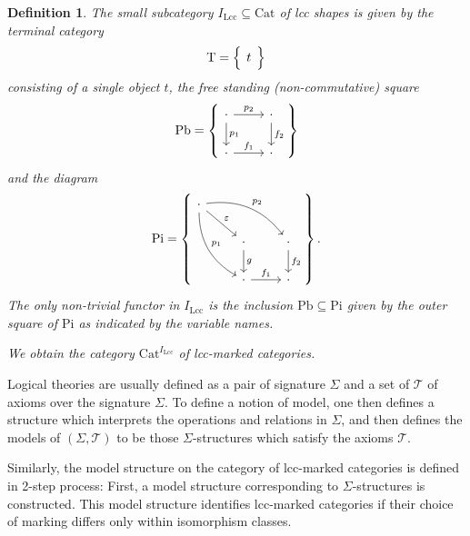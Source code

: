\documentclass{article}
\newtheorem{definition}{Definition}
\begin{document}
\begin{definition}
  The small subcategory $I_\mathrm{Lcc} \subseteq \mathrm{Cat}$ of \emph{lcc shapes} is given by the terminal category 
  \begin{equation}
    \mathrm{T} =
    \left\{
      \begin{tikzcd}
        t
      \end{tikzcd}
    \right\}
  \end{equation}
  consisting of a single object $t$, the free standing (non-commutative) square
  \begin{equation}
    \mathrm{Pb} =
    \left\{
      \begin{tikzcd}
        \cdot \arrow[d, "p_1"] \arrow[r, "p_2"] & \cdot \arrow[d, "f_2"] \\
        \cdot \arrow[r, "f_1"] & \cdot
      \end{tikzcd}
    \right\}
  \end{equation}
  and the diagram
  \begin{equation}
    \mathrm{Pi} =
    \left\{
      \begin{tikzcd}
        \cdot \arrow[ddr, bend right, "p_1"] \arrow[drr, bend left, "p_2"] \arrow[dr, "\varepsilon"] \\
        & \cdot \arrow[d, "g"] & \cdot \arrow[d, "f_2"] \\
        & \cdot \arrow[r, "f_1"] & \cdot
      \end{tikzcd}
    \right\}.
  \end{equation}
  The only non-trivial functor in $I_\mathrm{Lcc}$ is the inclusion $\mathrm{Pb} \subseteq \mathrm{Pi}$ given by the outer square of $\mathrm{Pi}$ as indicated by the variable names.

  We obtain the category $\mathrm{Cat}^{I_\mathrm{Lcc}}$ of \emph{lcc-marked categories}.
\end{definition}

Logical theories are usually defined as a pair of signature $\Sigma$ and a set of $\mathcal{T}$ of axioms over the signature $\Sigma$.
To define a notion of model, one then defines a structure which interprets the operations and relations in $\Sigma$, and then defines the models of $(\Sigma, \mathcal{T})$ to be those $\Sigma$-structures which satisfy the axioms $\mathcal{T}$.

Similarly, the model structure on the category of lcc-marked categories is defined in 2-step process:
First, a model structure corresponding to $\Sigma$-structures is constructed.
This model structure identifies lcc-marked categories if their choice of marking differs only within isomorphism classes.
\end{document}
